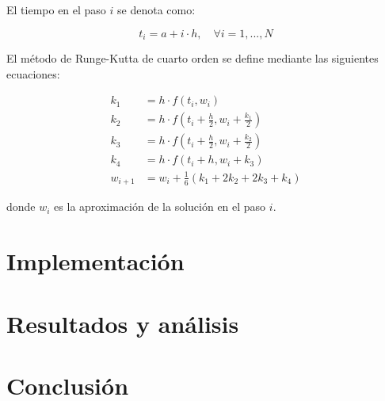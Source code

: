 \documentclass[12pt,a4]{article} %
\begin{document}
\begin{multicols}{2}
El tiempo en el paso $i$ se denota como:




\begin{equation}
    t_i = a + i \cdot h, \quad \forall i = 1, ..., N
\end{equation}




El método de Runge-Kutta de cuarto orden se define mediante las siguientes ecuaciones:

\begin{align}
    k_1 &= h \cdot f(t_i, w_i) \\
    k_2 &= h \cdot f(t_i + \frac{h}{2}, w_i + \frac{k_1}{2}) \\
    k_3 &= h \cdot f(t_i + \frac{h}{2}, w_i + \frac{k_2}{2}) \\
    k_4 &= h \cdot f(t_i + h, w_i + k_3) \\
    w_{i+1} &= w_i + \frac{1}{6}(k_1 + 2k_2 + 2k_3 + k_4)
\end{align}

donde $w_i$ es la aproximación de la solución en el paso $i$.


 
\section{Implementación}

\section{Resultados y análisis}

\section{Conclusión}


\appendix




\end{multicols}

\printbibliography
\end{document}

